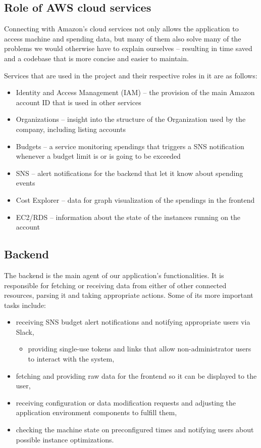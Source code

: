\documentclass[licencjacka,en]{thesisclass}
\begin{document}
    \subsection{Role of AWS cloud services}
    Connecting with Amazon's cloud services not only allows the application
    to access machine and spending data,
    but many of them also solve many of the problems we would otherwise have
    to explain ourselves -- resulting
    in time saved and a codebase that is more concise and easier to maintain.

    Services that are used in the project and their respective roles in it are as follows:
    \begin{itemize}
        \item Identity and Access Management (IAM) -- the provision of the main
          Amazon account ID that is used in other services
        \item Organizations -- insight into the structure of the Organization
          used by the company, including listing accounts
        \item Budgets -- a service monitoring spendings that triggers
          a SNS notification whenever a budget limit is or is going to be exceeded
        \item SNS -- alert notifications for the backend that let it know about spending events
        \item Cost Explorer -- data for graph visualization of the spendings in the frontend
        \item EC2/RDS -- information about the state of the instances running on the account
    \end{itemize}

    \subsection{Backend}

    The backend is the main agent of our application's functionalities.
    It is responsible for fetching or receiving data from either
    of other connected resources, parsing it and taking appropriate actions.
    Some of its more important tasks include:
    \begin{itemize}
        \item receiving SNS budget alert notifications
          and notifying appropriate users via Slack,
        \begin{itemize}
            \item providing single-use tokens and links
              that allow non-administrator users to interact with the system,
        \end{itemize}
        \item fetching and providing raw data for the frontend
          so it can be displayed to the user,
        \item receiving configuration or data modification requests
          and adjusting the application environment components to fulfill them,
        \item checking the machine state on preconfigured times
          and notifying users about possible instance optimizations.
    \end{itemize}
\end{document}
